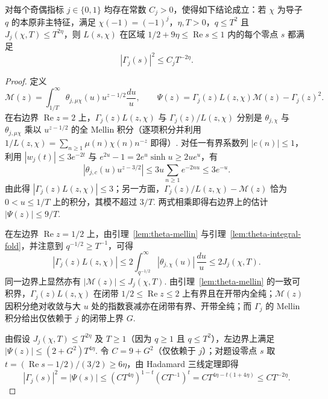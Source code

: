 \begin{lemma}
\label{lem:theta-three-lines}
\emitthmsource
对每个奇偶指标 $j\in\{0,1\}$ 均存在常数 $C_j>0$，使得如下结论成立：若 $\chi$ 为导子 $q$ 的本原非主特征，满足 $\chi(-1)=(-1)^j$，$\eta,T>0$，$q\le T^2$ 且 $J_j(\chi,T)\le T^{2\eta}$，则 $L(s,\chi)$ 在区域 $1/2+9\eta\le\operatorname{Re}s\le1$ 内的每个零点 $s$ 都满足
\[
 |\Gamma_j(s)|^2\le C_j T^{-2\eta}.
\]
\end{lemma}
\begin{proof}
定义
\[
 \mathcal M(z)=\int_{1/T}^\infty \theta_{j,\mu\chi}(u)u^{z-1/2}\frac{du}{u},
 \qquad
 \Psi(z)=\Gamma_j(z)L(z,\chi)\mathcal M(z)-\Gamma_j(z)^2.
\]
在右边界 $\operatorname{Re}z=2$ 上，$\Gamma_j(z)L(z,\chi)$ 与 $\Gamma_j(z)/L(z,\chi)$ 分别是 $\theta_{j,\chi}$ 与 $\theta_{j,\mu\chi}$ 乘以 $u^{z-1/2}$ 的全 Mellin 积分（逐项积分并利用 $1/L(z,\chi)=\sum_{n\ge1}\mu(n)\chi(n)n^{-z}$ 即得）. 对任一有界系数列 $|c(n)|\le1$，利用 $|w_j(t)|\le3e^{-2t}$ 与 $e^{2u}-1=2e^u\sinh u\ge2ue^u$，有
\[
 |\theta_{j,c}(u)u^{z-3/2}|
 \le 3u\sum_{n\ge1}e^{-2nu}\le 3e^{-u}.
\]
由此得 $|\Gamma_j(z)L(z,\chi)|\le3$；另一方面，$\Gamma_j(z)/L(z,\chi)-\mathcal M(z)$ 恰为 $0<u\le1/T$ 上的积分，其模不超过 $3/T$. 两式相乘即得右边界上的估计 $|\Psi(z)|\le9/T$.

在左边界 $\operatorname{Re}z=1/2$ 上，由引理~\ref{lem:theta-mellin} 与引理~\ref{lem:theta-integral-fold}，并注意到 $q^{-1/2}\ge T^{-1}$，可得
\[
 |\Gamma_j(z)L(z,\chi)|
 \le 2\int_{q^{-1/2}}^\infty|\theta_{j,\chi}(u)|\,\frac{du}{u}
 \le 2J_j(\chi,T).
\]
同一边界上显然亦有 $|\mathcal M(z)|\le J_j(\chi,T)$. 由引理~\ref{lem:theta-mellin} 的一致可积界，$\Gamma_j(z)L(z,\chi)$ 在闭带 $1/2\le\operatorname{Re}z\le2$ 上有界且在开带内全纯；$\mathcal M(z)$ 因积分绝对收敛与大 $u$ 处的指数衰减亦在闭带有界、开带全纯；而 $\Gamma_j$ 的 Mellin 积分给出仅依赖于 $j$ 的闭带上界 $G$.

由假设 $J_j(\chi,T)\le T^{2\eta}$ 及 $T\ge1$（因为 $q\ge1$ 且 $q\le T^2$），左边界上满足 $|\Psi(z)|\le (2+G^2)T^{4\eta}$. 令 $C=9+G^2$（仅依赖于 $j$）；对题设零点 $s$ 取 $t=(\operatorname{Re}s-1/2)/(3/2)\ge6\eta$，由 Hadamard 三线定理即得
\[
 |\Gamma_j(s)|^2=|\Psi(s)|
 \le (CT^{4\eta})^{1-t}(CT^{-1})^t
 =CT^{4\eta-t(1+4\eta)}\le CT^{-2\eta}.
\]
\end{proof}

